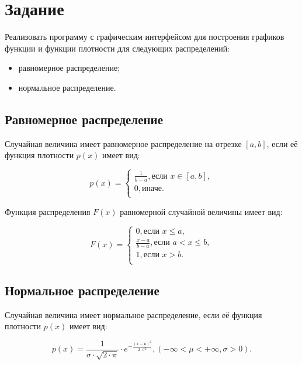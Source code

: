 \chapter{Задание}

Реализовать программу с графическим интерфейсом для построения графиков функции и функции плотности для следующих распределений:
\begin{itemize}
	\item равномерное распределение;
	\item нормальное распределение.
\end{itemize}

\section{Равномерное распределение}

Случайная величина имеет равномерное распределение на отрезке $[a, b]$, если её функция плотности $p(x)$ имеет вид:

\begin{equation}
    p(x) = 
    \begin{cases}
        \frac{1}{b - a}, \text{если } x \in [a, b],\\
        0, \text{иначе.} \\
    \end{cases}
\end{equation}

Функция распределения $F(x)$ равномерной случайной величины имеет вид:

\begin{equation}
    F(x) = 
    \begin{cases}
    		0, \text{если } x \leqslant a, \\
        \frac{x - a}{b - a}, \text{если } a < x \leqslant b,\\
        1, \text{если } x > b. \\
    \end{cases}
\end{equation}

\section{Нормальное распределение}

Случайная величина имеет нормальное распределение, если её функция плотности $p(x)$ имеет вид:

\begin{equation}
    p(x) = \frac{1}{\sigma \cdot \sqrt{2 \cdot \pi}} \cdot e^{-\frac{(x - \mu)^2}{2 \cdot \sigma^2}}, (-\infty < \mu < +\infty, \sigma > 0).
\end{equation}

